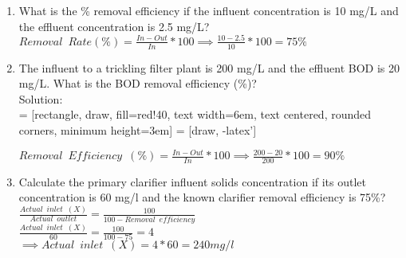 \documentclass{article}
\begin{document}
\begin{enumerate}
\item What is the \% removal efficiency if the influent concentration is 10 mg/L and the effluent concentration is 2.5 mg/L?\\
$Removal \enspace Rate (\%) = \frac{In-Out}{In}*100 \implies \frac{10-2.5}{10}*100=\boxed{75\%}$

\item The influent to a trickling filter plant is 200 mg/L and the effluent BOD is 20 mg/L. What is the BOD removal efficiency (\%)?\\
Solution:\\
\vspace{0.3cm}
 = [rectangle, draw, fill=red!40, 
    text width=6em, text centered, rounded corners, minimum height=3em]
 = [draw, -latex']
\begin{figure}[!h]
\centering
{}
\end{figure}
\vspace{0.5cm}
$Removal \enspace Efficiency \enspace (\%) = \frac{In-Out}{In}*100 \implies \frac{200-20}{200}*100=\boxed{90\%}$




\item Calculate the primary clarifier influent solids concentration if its outlet concentration is 60 mg/l and the known clarifier removal efficiency is 75\%?\\
$\frac{Actual \enspace  inlet \enspace (X)}{Actual \enspace outlet}=\frac{100}{100-Removal \enspace efficiency}$\\ 
$\frac{Actual \enspace  inlet \enspace (X)}{60}=\frac{100}{100-75}=4$\\
$\implies Actual \enspace inlet \enspace (X)=4*60 = \boxed{240 mg/l}$\\


\end{enumerate}
\end{document}
